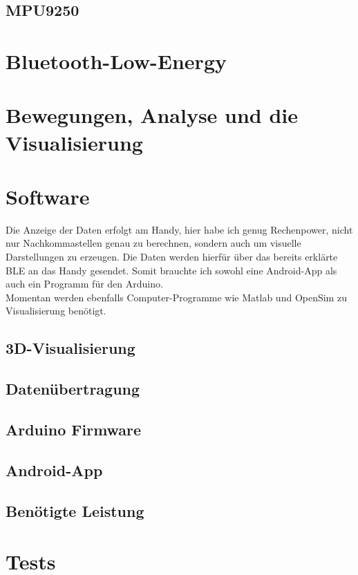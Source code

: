 \documentclass[11pt, titlepage, parskip=half-]{scrreprt}
\begin{document}
\section{MPU9250}


\chapter{Bluetooth-Low-Energy}


\chapter{Bewegungen, Analyse und die Visualisierung}


\chapter{Software}
Die Anzeige der Daten erfolgt am Handy, hier habe ich genug Rechenpower,
nicht nur Nachkommastellen genau zu berechnen, sondern auch um 
visuelle Darstellungen zu erzeugen. Die Daten werden hierfür über das bereits
erklärte BLE an das Handy gesendet.
Somit brauchte ich sowohl eine Android-App als auch ein Programm für den Arduino. \\ 
Momentan werden ebenfalls Computer-Programme wie Matlab und OpenSim zu Visualisierung benötigt.
\section{3D-Visualisierung}

\section{Datenübertragung}

\section{Arduino Firmware}

\section{Android-App}

\section{Benötigte Leistung}


\chapter{Tests}

%
%
\end{document}
